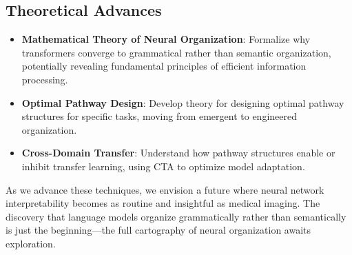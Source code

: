 \subsection{Theoretical Advances}

\begin{itemize}
    \item \textbf{Mathematical Theory of Neural Organization}: Formalize why transformers converge to grammatical rather than semantic organization, potentially revealing fundamental principles of efficient information processing.
    
    \item \textbf{Optimal Pathway Design}: Develop theory for designing optimal pathway structures for specific tasks, moving from emergent to engineered organization.
    
    \item \textbf{Cross-Domain Transfer}: Understand how pathway structures enable or inhibit transfer learning, using CTA to optimize model adaptation.
\end{itemize}

As we advance these techniques, we envision a future where neural network interpretability becomes as routine and insightful as medical imaging. The discovery that language models organize grammatically rather than semantically is just the beginning—the full cartography of neural organization awaits exploration.